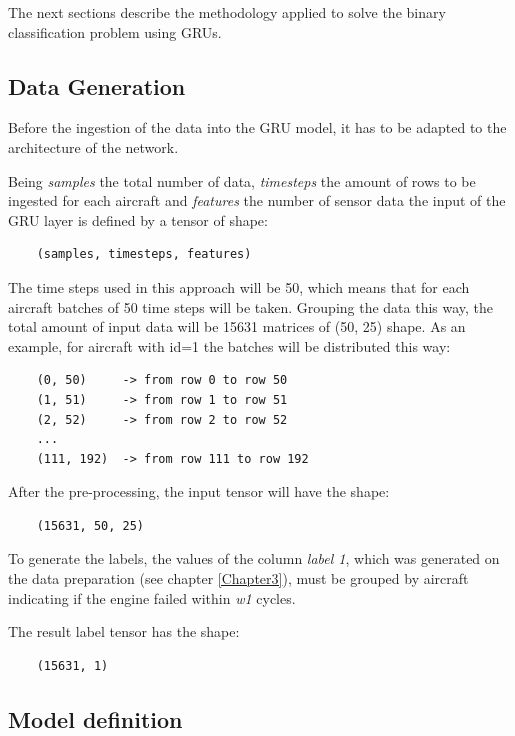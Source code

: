 The next sections describe the methodology applied to solve the binary classification problem using GRUs.

\subsection{Data Generation}

Before the ingestion of the data into the GRU model, it has to be adapted to the architecture of the network.

Being \textit{samples} the total number of data, \textit{timesteps} the amount of rows to be ingested for each aircraft and \textit{features} the number of sensor data the input of the GRU layer is defined by a tensor of shape:

\begin{verbatim}
    (samples, timesteps, features)
\end{verbatim}

The time steps used in this approach will be 50, which means that for each aircraft batches of 50 time steps will be taken.
Grouping the data this way, the total amount of input data will be 15631 matrices of (50, 25) shape.
As an example, for aircraft with id=1 the batches will be distributed this way:

\begin{verbatim}
    (0, 50)     -> from row 0 to row 50
    (1, 51)     -> from row 1 to row 51
    (2, 52)     -> from row 2 to row 52
    ...
    (111, 192)  -> from row 111 to row 192
\end{verbatim}

After the pre-processing, the input tensor will have the shape:

\begin{verbatim}
    (15631, 50, 25)
\end{verbatim}

To generate the labels, the values of the column \textit{label 1}, which was generated on the data preparation (see chapter \ref{Chapter3}), must be grouped by aircraft indicating if the engine failed within \textit{w1} cycles.

The result label tensor has the shape:

\begin{verbatim}
    (15631, 1)
\end{verbatim}


\subsection{Model definition}

